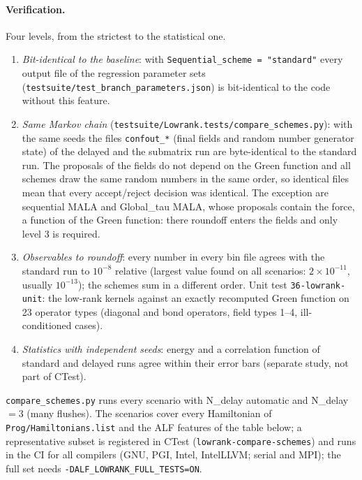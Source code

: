 \paragraph{Verification.}
Four levels, from the strictest to the statistical one.
\begin{enumerate}
\item \emph{Bit-identical to the baseline}: with \texttt{Sequential\_scheme = "standard"} every output
file of the regression parameter sets (\texttt{testsuite/test\_branch\_parameters.json}) is bit-identical
to the code without this feature.
\item \emph{Same Markov chain} (\texttt{testsuite/Lowrank.tests/compare\_schemes.py}): with the same seeds the
files \texttt{confout\_*} (final fields and random number generator state) of the delayed and the submatrix
run are byte-identical to the standard run. The proposals of the fields do not depend on the Green
function and all schemes draw the same random numbers in the same order, so identical files mean that
every accept/reject decision was identical. The exception are sequential MALA and Global\_tau MALA, whose proposals contain the force, a
function of the Green function: there roundoff enters the fields and only level 3 is required.
\item \emph{Observables to roundoff}: every number in every bin file agrees with the standard run to
$10^{-8}$ relative (largest value found on all scenarios: $2\times10^{-11}$, usually $10^{-13}$); the
schemes sum in a different order. Unit test \texttt{36-lowrank-unit}: the low-rank kernels against an
exactly recomputed Green function on 23 operator types (diagonal and bond operators, field types
1--4, ill-conditioned cases).
\item \emph{Statistics with independent seeds}: energy and a correlation function of standard and
delayed runs agree within their error bars (separate study, not part of CTest).
\end{enumerate}
\texttt{compare\_schemes.py} runs every scenario with N\_delay automatic and N\_delay $=3$ (many
flushes). The scenarios cover every Hamiltonian of \texttt{Prog/Hamiltonians.list} and the ALF
features of the table below; a representative subset is registered in CTest
(\texttt{lowrank-compare-schemes}) and runs in the CI for all compilers (GNU, PGI, Intel, IntelLLVM;
serial and MPI); the full set needs \texttt{-DALF\_LOWRANK\_FULL\_TESTS=ON}.

